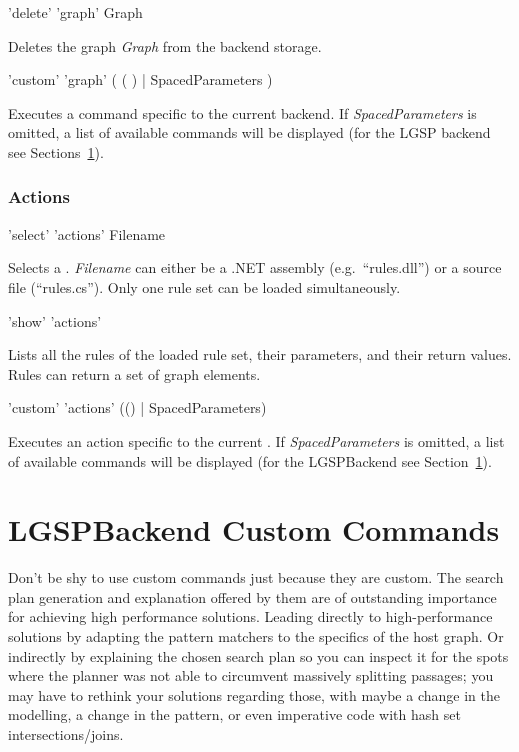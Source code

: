 \begin{rail}
  'delete' 'graph' Graph
\end{rail}
Deletes the graph \emph{Graph} from the backend storage.

\begin{rail}
  'custom' 'graph' ( ( ) | SpacedParameters )
\end{rail}
Executes a command specific to the current backend.
If \emph{SpacedParameters} is omitted, a list of available commands will be displayed (for the LGSP backend see Sections~\ref{custom}).


\subsubsection*{Actions}

\begin{rail}
  'select' 'actions' Filename
\end{rail}
Selects a .
\emph{Filename} can either be a .NET assembly (e.g.\ ``rules.dll'') or a source file (``rules.cs'').
Only one rule set can be loaded simultaneously.

\begin{rail}
  'show' 'actions'
\end{rail}
Lists all the rules of the loaded rule set, their parameters, and their return values.
Rules can return a set of graph elements.

\begin{rail}
  'custom' 'actions' (() | SpacedParameters)
\end{rail}
Executes an action specific to the current .
If \emph{SpacedParameters} is omitted, a list of available commands will be displayed (for the LGSPBackend see Section~\ref{custom}).


\section{LGSPBackend Custom Commands}
\label{custom}


Don't be shy to use custom commands just because they are custom.
The search plan generation and explanation offered by them are of outstanding importance for achieving high performance solutions.
Leading directly to high-performance solutions by adapting the pattern matchers to the specifics of the host graph.
Or indirectly by explaining the chosen search plan so you can inspect it for the spots where the planner was not able to circumvent massively splitting passages; you may have to rethink your solutions regarding those, with maybe a change in the modelling, a change in the pattern, or even imperative code with hash set intersections/joins.

